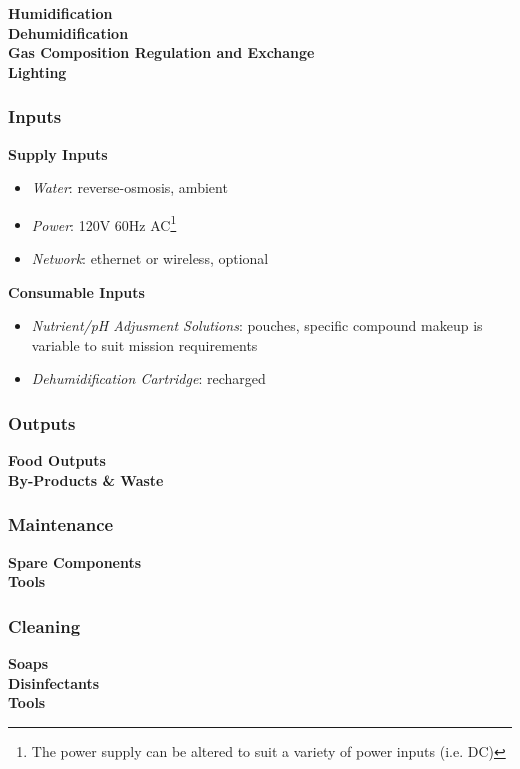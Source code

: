 \clearpage

\textbf{Humidification}\\


\textbf{Dehumidification}\\


\textbf{Gas Composition Regulation and Exchange}\\


\textbf{Lighting}\\


\subsubsection{Inputs}

\textbf{Supply Inputs}
\begin{itemize}
    \item \textit{Water}: reverse-osmosis, ambient
    \item \textit{Power}: 120V 60Hz AC\footnote{The power supply can be altered to suit a variety of power inputs (i.e. DC)}
    \item \textit{Network}: ethernet or wireless, optional
\end{itemize}

\textbf{Consumable Inputs}
\begin{itemize}
    \item \textit{Nutrient/pH Adjusment Solutions}: pouches, specific compound makeup is variable to suit mission requirements
    \item \textit{Dehumidification Cartridge}: recharged
\end{itemize}

\subsubsection{Outputs}

\textbf{Food Outputs}\\


\textbf{By-Products \& Waste}\\


\subsubsection{Maintenance}

\textbf{Spare Components}\\


\textbf{Tools}\\


\subsubsection{Cleaning}

\textbf{Soaps}\\


\textbf{Disinfectants}\\


\textbf{Tools}\\

